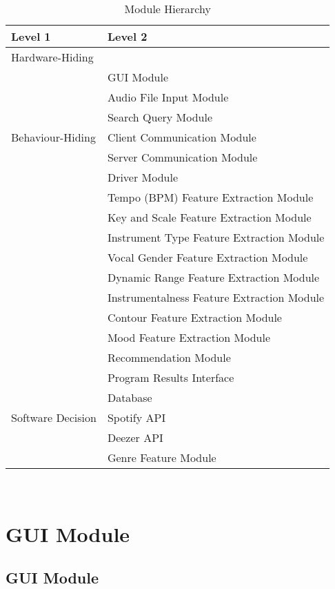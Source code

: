 \documentclass[12pt, titlepage]{article}
\begin{document}
\begin{table}[h!]
\centering
\begin{tabular}{p{} p{}}
\toprule
\textbf{Level 1} & \textbf{Level 2}\\
\midrule

{Hardware-Hiding} & ~ \\
\midrule

\multirow{7}{0.3\textwidth}{Behaviour-Hiding} & GUI Module\\
& Audio File Input Module\\
& Search Query Module\\
& Client Communication Module\\
& Server Communication Module\\
& Driver Module\\
& Tempo (BPM) Feature Extraction Module\\
& Key and Scale Feature Extraction Module\\
& Instrument Type Feature Extraction Module\\
& Vocal Gender Feature Extraction Module\\
& Dynamic Range Feature Extraction Module\\
& Instrumentalness Feature Extraction Module\\
& Contour Feature Extraction Module\\
& Mood Feature Extraction Module\\
& Recommendation Module\\
& Program Results Interface\\
\midrule

\multirow{3}{0.3\textwidth}{Software Decision} & Database\\
& Spotify API\\
& Deezer API\\
& Genre Feature Module\\
\bottomrule

\end{tabular}
\caption{Module Hierarchy}
\label{TblMH}
\end{table}

\newpage
~\newpage

\section{GUI Module} \label{Module}

\subsection{GUI Module}
\end{document}
